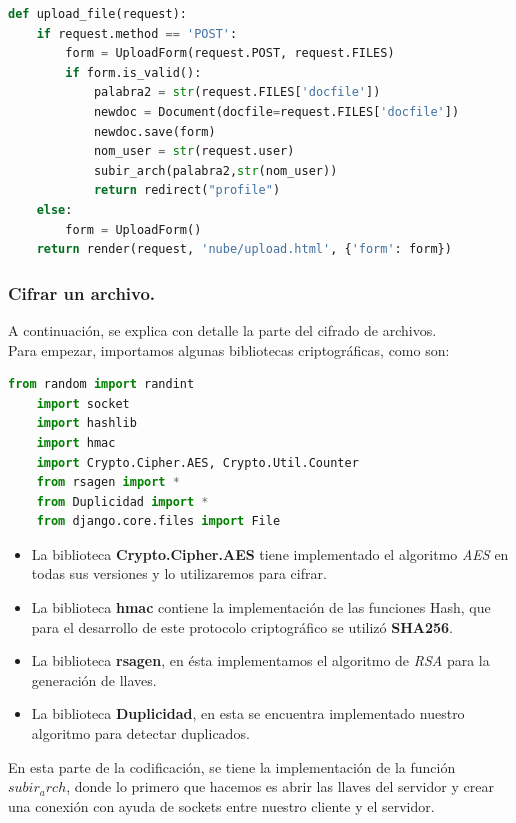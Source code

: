 \begin{lstlisting}[language=Python,frame=single, keywordstyle=\color{blue},breaklines=true]
def upload_file(request):
    if request.method == 'POST':
        form = UploadForm(request.POST, request.FILES)
        if form.is_valid():
            palabra2 = str(request.FILES['docfile'])
            newdoc = Document(docfile=request.FILES['docfile'])
            newdoc.save(form)
            nom_user = str(request.user)
            subir_arch(palabra2,str(nom_user))
            return redirect("profile")
    else:
        form = UploadForm()
    return render(request, 'nube/upload.html', {'form': form})

\end{lstlisting}

\subsubsection{Cifrar un archivo.} 
A continuación, se explica con detalle la parte del cifrado de archivos. \\
Para empezar, importamos algunas bibliotecas criptográficas, como son:

\begin{lstlisting}[language=Python,frame=single, keywordstyle=\color{blue},breaklines=true]
	from random import randint
	import socket
	import hashlib
	import hmac
	import Crypto.Cipher.AES, Crypto.Util.Counter
	from rsagen import *
	from Duplicidad import *
	from django.core.files import File
\end{lstlisting}


\begin{itemize}
	\item  La biblioteca \textbf{Crypto.Cipher.AES} tiene implementado el algoritmo \textit{AES} en todas sus versiones y lo utilizaremos para cifrar.
	\item  La biblioteca \textbf{hmac} contiene la implementación de las funciones Hash, que para el desarrollo de este protocolo criptográfico se utilizó \textbf{SHA256}.
	\item La biblioteca \textbf{rsagen}, en ésta implementamos el algoritmo de \textit{RSA} para la generación de llaves.
	\item La biblioteca \textbf{Duplicidad}, en esta se encuentra implementado nuestro algoritmo para detectar duplicados.

\end{itemize}



En esta parte de la codificación, se tiene la implementación de la función \textbf{$subir_arch$}, donde lo primero que hacemos es abrir las llaves del servidor y crear una conexión con ayuda de sockets entre nuestro cliente y el servidor.
		
